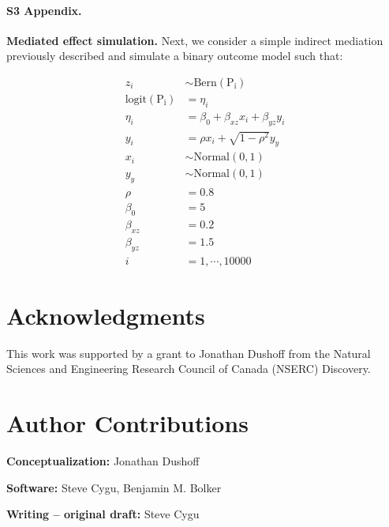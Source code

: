 \paragraph*{S3 Appendix.}
\label{S3_Appendix}
{\bf Mediated effect simulation.} Next, we consider a simple indirect mediation previously described and simulate a binary outcome model such that:

\begin{align}\label{sim:simple_mediate}
z_i &\sim \mathrm{Bern}(\mathrm{P_i}) \nonumber\\
\mathrm{logit}(\mathrm{P_i}) &= \eta_i \nonumber\\
\eta_i &= \beta_0 + \beta_{xz} x_i + \beta_{yz} y_i \nonumber\\
y_i &= \rho x_i + \sqrt{1-\rho^2} y_y \nonumber\\
x_i &\sim \mathrm{Normal(0, 1)} \nonumber\\
y_y &\sim \mathrm{Normal(0, 1)} \nonumber\\
\rho &= 0.8 \nonumber\\
\beta_0 &= 5 \nonumber\\
\beta_{xz} &= 0.2 \nonumber\\
\beta_{yz} &= 1.5 \nonumber\\
i &= 1,\cdots, 10000
\end{align}


\section*{Acknowledgments}

This work was supported by a grant to Jonathan Dushoff from the Natural Sciences and Engineering Research Council of Canada (NSERC) Discovery.

\section*{Author Contributions}

\textbf{Conceptualization:} Jonathan Dushoff

\noindent\textbf{Software:} Steve Cygu, Benjamin M. Bolker

\noindent\textbf{Writing – original draft:} Steve Cygu


\nolinenumbers
